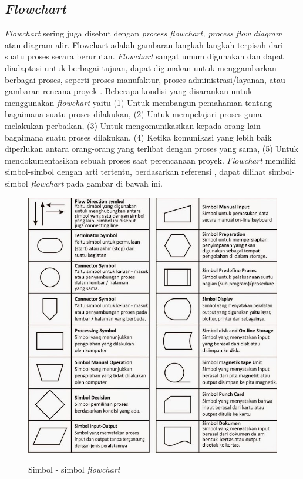 \begin{flushleft}
\begin{justify}
        \subsection{\textit{Flowchart}}
            \textit{Flowchart} sering juga disebut dengan \textit{process flowchart, process flow diagram} atau diagram alir. Flowchart adalah gambaran langkah-langkah terpisah dari suatu proses secara berurutan. 
            \textit{Flowchart} sangat umum digunakan dan dapat diadaptasi untuk berbagai tujuan, dapat digunakan untuk menggambarkan berbagai proses, seperti proses manufaktur, proses administrasi/layanan, atau gambaran rencana proyek \cite{Flowchart}.
            Beberapa kondisi yang disarankan untuk menggunakan \textit{flowchart} yaitu 
            (1) Untuk membangun pemahaman tentang bagaimana suatu proses dilakukan,
            (2) Untuk mempelajari proses guna melakukan perbaikan,
            (3) Untuk mengomunikasikan kepada orang lain bagaimana suatu proses dilakukan,
            (4) Ketika komunikasi yang lebih baik diperlukan antara orang-orang yang terlibat dengan proses yang sama,
            (5) Untuk mendokumentasikan sebuah proses saat perencanaan proyek. \textit{Flowchart} memiliki simbol-simbol dengan arti tertentu, berdasarkan referensi \cite{gambar fc}, dapat dilihat simbol-simbol \emph{flowchart} pada gambar di bawah ini.
            \begin{figure}[ht]
                \centering
               
            \includegraphics[width=12cm]{images/bab 2/symbol-fc.jpeg}\\
                \caption{Simbol - simbol \textit{flowchart}}
            \end{figure}


\end{justify}
\end{flushleft}
